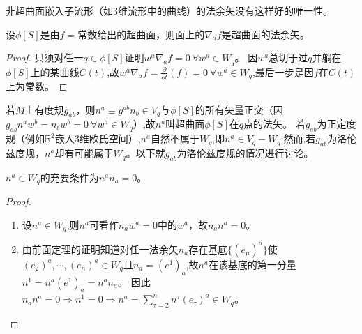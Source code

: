 \begin{note}
	非超曲面嵌入子流形（如$3$维流形中的曲线）的法余矢没有这样好的唯一性。
\end{note}

\begin{theorem}
	设$\phi[S]$是由$f = \text{常数}$给出的超曲面，则面上的$\nabla_af$是超曲面的法余矢。
\end{theorem}

\begin{proof}
	只须对任一$q \in \phi[S]$证明$w^a\nabla_af = 0 ~ \forall w^a \in W_q$。
	因$w^a$总切于过$q$并躺在$\phi[S]$上的某曲线$C(t)$,故$w^a\nabla_af = \frac{\partial}{\partial t}(f) = 0 ~ \forall w^a \in W_q$,最后一步是因$f$在$C(t)$上为常数。
\end{proof}

若$M$上有度规$g_{ab}$，则$n^a \equiv g^{ab}n_b \in V_q$与$\phi[S]$的所有矢量正交（因$g_{ab}n^aw^b = n_bw^b = 0 ~ \forall w^a \in W_q$）,故$n^a$叫超曲面$\phi[S]$在$q$点的法矢。
若$g_{ab}$为正定度规（例如$\mathbb{R}^2$嵌入$3$维欧氏空间）,$n^a$自然不属于$W_q$,即$n^a \in V_q - W_q$;然而,若$g_{ab}$为洛伦兹度规，$n^a$却有可能属于$W_q$。以下就$g_{ab}$为洛伦兹度规的情况进行讨论。

\begin{theorem}
	$n^a \in W_q$的充要条件为$n^an_a = 0$。
\end{theorem}

\begin{proof}
	\begin{enumerate}[（A）]
		\item 设$n^a \in W_q$,则$n^a$可看作$n_aw^a = 0$中的$w^a$，故$n_an^a = 0$。
		\item 由前面定理的证明知道对任一法余矢$n_a$存在基底$\{(e_\mu)^a\}$使$(e_2)^a, \cdots, (e_n)^a \in W_q$且$n_a = (e^1)_a$,故$n^a$在该基底的第一分量$n^1 = n^a(e^1)_a = n^an_a$。
		      因此$n_an^a = 0 \Rightarrow n^1 = 0 \Rightarrow n^a = \sum^n_{\tau = 2}n^\tau(e_\tau)^a \in W_q$。
	\end{enumerate}
\end{proof}

